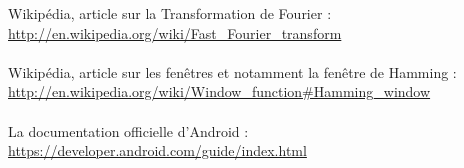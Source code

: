 \noindent
Wikipédia, article sur la Transformation de Fourier :
\url{http://en.wikipedia.org/wiki/Fast_Fourier_transform}\\
\\
Wikipédia, article sur les fenêtres et notamment la fenêtre de Hamming : 
\url{http://en.wikipedia.org/wiki/Window_function#Hamming_window}\\
\\
La documentation officielle d'Android : \url{https://developer.android.com/guide/index.html}\\
